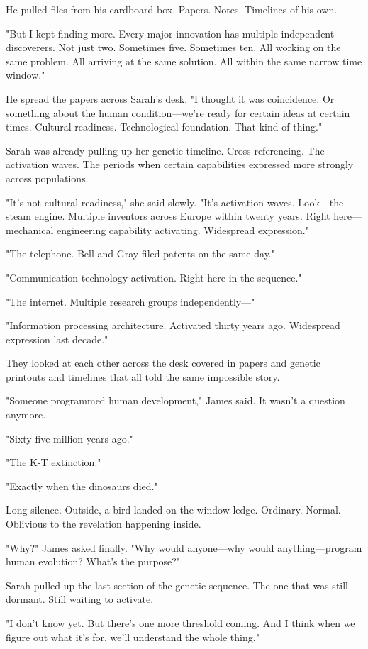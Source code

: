 He pulled files from his cardboard box. Papers. Notes. Timelines of his own.

"But I kept finding more. Every major innovation has multiple independent discoverers. Not just two. Sometimes five. Sometimes ten. All working on the same problem. All arriving at the same solution. All within the same narrow time window."

He spread the papers across Sarah's desk. "I thought it was coincidence. Or something about the human condition—we're ready for certain ideas at certain times. Cultural readiness. Technological foundation. That kind of thing."

Sarah was already pulling up her genetic timeline. Cross-referencing. The activation waves. The periods when certain capabilities expressed more strongly across populations.

"It's not cultural readiness," she said slowly. "It's activation waves. Look—the steam engine. Multiple inventors across Europe within twenty years. Right here—mechanical engineering capability activating. Widespread expression."

"The telephone. Bell and Gray filed patents on the same day."

"Communication technology activation. Right here in the sequence."

"The internet. Multiple research groups independently—"

"Information processing architecture. Activated thirty years ago. Widespread expression last decade."

They looked at each other across the desk covered in papers and genetic printouts and timelines that all told the same impossible story.

"Someone programmed human development," James said. It wasn't a question anymore.

"Sixty-five million years ago."

"The K-T extinction."

"Exactly when the dinosaurs died."

Long silence. Outside, a bird landed on the window ledge. Ordinary. Normal. Oblivious to the revelation happening inside.

"Why?" James asked finally. "Why would anyone—why would anything—program human evolution? What's the purpose?"

Sarah pulled up the last section of the genetic sequence. The one that was still dormant. Still waiting to activate.

"I don't know yet. But there's one more threshold coming. And I think when we figure out what it's for, we'll understand the whole thing."

